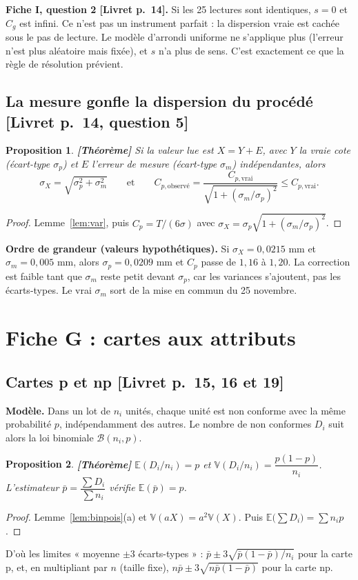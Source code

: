 \documentclass[11pt,a4paper]{article}
\theoremstyle{tq}
\newtheorem{prop}{Proposition}
\theoremstyle{remark}
\newcommand{\thm}{\textcolor{vertTQ}{\textbf{[Théorème]}}}
\newcommand{\liv}[1]{\textcolor{uimmblue}{\small[Livret p.~#1]}}
\newcommand{\E}{\mathbb{E}}
\newcommand{\V}{\mathbb{V}}
\begin{document}
\textbf{Fiche I, question 2 \liv{14}.} Si les 25 lectures sont identiques, $s=0$ et $C_g$ est infini. Ce n'est pas un instrument parfait : la dispersion vraie est cachée sous le pas de lecture. Le modèle d'arrondi uniforme ne s'applique plus (l'erreur n'est plus aléatoire mais fixée), et $s$ n'a plus de sens. C'est exactement ce que la règle de résolution prévient.

\subsection{La mesure gonfle la dispersion du procédé \liv{14, question 5}}
\begin{prop}\thm{}
Si la valeur lue est $X=Y+E$, avec $Y$ la vraie cote (écart-type $\sigma_p$) et $E$ l'erreur de mesure (écart-type $\sigma_m$) indépendantes, alors
\[
\sigma_X=\sqrt{\sigma_p^2+\sigma_m^2}\qquad\text{et}\qquad C_{p,\text{observé}}=\frac{C_{p,\text{vrai}}}{\sqrt{1+(\sigma_m/\sigma_p)^2}}\le C_{p,\text{vrai}} .
\]
\end{prop}
\begin{proof}
Lemme~\ref{lem:var}, puis $C_p=T/(6\sigma)$ avec $\sigma_X=\sigma_p\sqrt{1+(\sigma_m/\sigma_p)^2}$.
\end{proof}
\textbf{Ordre de grandeur (valeurs hypothétiques).} Si $\sigma_X=0{,}0215$ mm et $\sigma_m=0{,}005$ mm, alors $\sigma_p=0{,}0209$ mm et $C_p$ passe de $1{,}16$ à $1{,}20$. La correction est faible tant que $\sigma_m$ reste petit devant $\sigma_p$, car les variances s'ajoutent, pas les écarts-types. Le vrai $\sigma_m$ sort de la mise en commun du 25 novembre.

\section{Fiche G : cartes aux attributs}\label{sec:G}

\subsection{Cartes p et np \liv{15, 16 et 19}}
\textbf{Modèle.} Dans un lot de $n_i$ unités, chaque unité est non conforme avec la même probabilité $p$, indépendamment des autres. Le nombre de non conformes $D_i$ suit alors la loi binomiale $\mathcal B(n_i,p)$.
\begin{prop}\thm{}
$\E(D_i/n_i)=p$ et $\V(D_i/n_i)=\dfrac{p(1-p)}{n_i}$. L'estimateur $\bar p=\dfrac{\sum D_i}{\sum n_i}$ vérifie $\E(\bar p)=p$.
\end{prop}
\begin{proof}
Lemme~\ref{lem:binpois}(a) et $\V(aX)=a^2\V(X)$. Puis $\E\big(\sum D_i\big)=\sum n_ip$.
\end{proof}
D'où les limites « moyenne $\pm3$ écarts-types » : $\bar p\pm3\sqrt{\bar p(1-\bar p)/n_i}$ pour la carte p, et, en multipliant par $n$ (taille fixe), $n\bar p\pm3\sqrt{n\bar p(1-\bar p)}$ pour la carte np.
\end{document}
